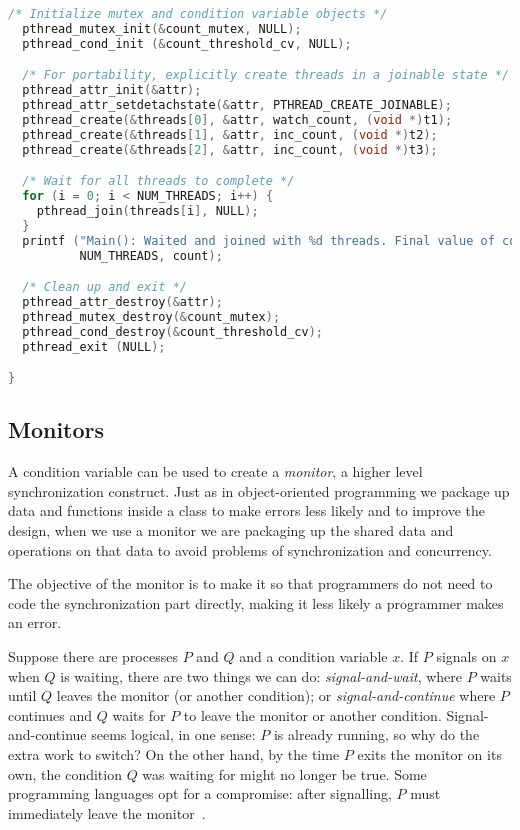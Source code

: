 \begin{lstlisting}[language=C]
  /* Initialize mutex and condition variable objects */
  pthread_mutex_init(&count_mutex, NULL);
  pthread_cond_init (&count_threshold_cv, NULL);

  /* For portability, explicitly create threads in a joinable state */
  pthread_attr_init(&attr);
  pthread_attr_setdetachstate(&attr, PTHREAD_CREATE_JOINABLE);
  pthread_create(&threads[0], &attr, watch_count, (void *)t1);
  pthread_create(&threads[1], &attr, inc_count, (void *)t2);
  pthread_create(&threads[2], &attr, inc_count, (void *)t3);

  /* Wait for all threads to complete */
  for (i = 0; i < NUM_THREADS; i++) {
    pthread_join(threads[i], NULL);
  }
  printf ("Main(): Waited and joined with %d threads. Final value of count = %d. Done.\n", 
          NUM_THREADS, count);

  /* Clean up and exit */
  pthread_attr_destroy(&attr);
  pthread_mutex_destroy(&count_mutex);
  pthread_cond_destroy(&count_threshold_cv);
  pthread_exit (NULL);

}
\end{lstlisting}


\subsection*{Monitors}
A condition variable can be used to create a \textit{monitor}, a higher level synchronization construct. Just as in object-oriented programming we package up data and functions inside a class to make errors less likely and to improve the design, when we use a monitor we are packaging up the shared data and operations on that data to avoid problems of synchronization and concurrency.

The objective of the monitor is to make it so that programmers do not need to code the synchronization part directly, making it less likely a programmer makes an error.


Suppose there are processes $P$ and $Q$ and a condition variable $x$. If $P$ signals on $x$ when $Q$ is waiting, there are two things we can do: \textit{signal-and-wait}, where $P$ waits until $Q$ leaves the monitor (or another condition); or \textit{signal-and-continue} where $P$ continues and $Q$ waits for $P$ to leave the monitor or another condition. Signal-and-continue seems logical, in one sense: $P$ is already running, so why do the extra work to switch? On the other hand, by the time $P$ exits the monitor on its own, the condition $Q$ was waiting for might no longer be true. Some programming languages opt for a compromise: after signalling, $P$ must immediately leave the monitor~\cite{osc}.

